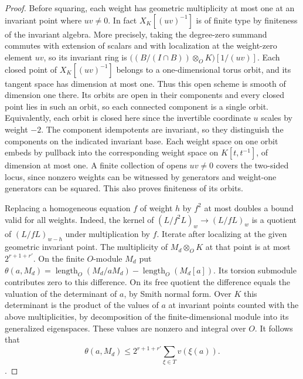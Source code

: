 \begin{proof}
Before squaring, each weight has geometric multiplicity at most
one at an invariant point where \(uv\ne0\). In fact
\(X_K[(uv)^{-1}]\) is of finite type by finiteness of the invariant
algebra. More precisely, taking the degree-zero summand commutes
with extension of scalars and with localization at the weight-zero
element \(uv\), so its invariant ring is
\(\big((B/(I\cap B))\otimes_O K\big)[1/(uv)]\).
Each closed point of \(X_K[(uv)^{-1}]\) belongs to a one-dimensional
torus orbit, and its tangent space has dimension at most one.
Thus this open scheme is smooth of dimension one there. Its orbits
are open in their components and every closed point lies in such an
orbit, so each connected component is a single orbit. Equivalently,
each orbit is closed here since the invertible coordinate \(u\)
scales by weight \(-2\). The component idempotents are invariant,
so they distinguish the components on the indicated invariant base.
Each weight space on one orbit embeds by pullback into
the corresponding weight space on \(K[t,t^{-1}]\), of dimension at
most one. A finite collection of opens \(uv\ne0\) covers the
two-sided locus, since nonzero weights can be witnessed by
generators and weight-one generators can be squared. This also proves
finiteness of its orbits.

Replacing a homogeneous equation \(f\) of weight \(h\) by \(f^2\)
at most doubles a bound valid for all weights. Indeed, the kernel of
\((L/f^2L)_w\to(L/fL)_w\) is a quotient of \((L/fL)_{w-h}\)
under multiplication by \(f\). Iterate after localizing at the given
geometric invariant point. The multiplicity of \(M_d\otimes_O K\)
at that point is at most \(2^{r+1+r'}\).
On the finite \(O\)-module \(M_d\) put
\(\theta(a,M_d)=\operatorname{length}_O(M_d/aM_d)
-\operatorname{length}_O(M_d[a])\).
Its torsion submodule contributes zero to this difference.
On its free quotient the difference equals the valuation of the
determinant of \(a\), by Smith normal form. Over \(K\) this
determinant is the product of the values of \(a\) at invariant
points counted with the above multiplicities, by decomposition of
the finite-dimensional module into its generalized eigenspaces.
These values are nonzero and integral over \(O\). It follows that
\begin{equation}\label{newcoh:upperorbit}
 \theta(a,M_d)\le 2^{r+1+r'}\sum_{\xi\in T} v(\xi(a)).
\end{equation}
.


\end{proof}
